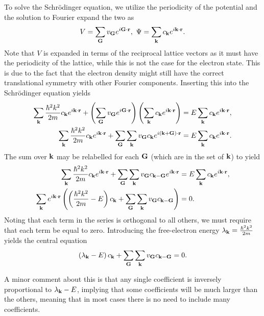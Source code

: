 To solve the Schrödinger equation, we utilize the periodicity of the potential and the solution to Fourier expand the two as
\begin{align*}
	V = \sum\limits_{\vb{G}}v_{\vb{G}}e^{i\vb{G}\cdot\vb{r}},\ \Psi = \sum\limits_{\vb{k}}c_{\vb{k}}e^{i\vb{k}\cdot\vb{r}}.
\end{align*}
Note that $V$ is expanded in terms of the reciprocal lattice vectors as it must have the periodicity of the lattice, while this is not the case for the electron state. This is due to the fact that the electron density might still have the correct translational symmetry with other Fourier components. Inserting this into the Schrödinger equation yields
\begin{align*}
	\sum\limits_{\vb{k}}\frac{\hbar^{2}k^{2}}{2m}c_{\vb{k}}e^{i\vb{k}\cdot\vb{r}} + \left(\sum\limits_{\vb{G}}v_{\vb{G}}e^{i\vb{G}\cdot\vb{r}}\right)\left(\sum\limits_{\vb{k}}c_{\vb{k}}e^{i\vb{k}\cdot\vb{r}}\right) &= E\sum\limits_{\vb{k}}c_{\vb{k}}e^{i\vb{k}\cdot\vb{r}}, \\
	\sum\limits_{\vb{k}}\frac{\hbar^{2}k^{2}}{2m}c_{\vb{k}}e^{i\vb{k}\cdot\vb{r}} + \sum\limits_{\vb{G}}\sum\limits_{\vb{k}}v_{\vb{G}}c_{\vb{k}}e^{i(\vb{k} + \vb{G})\cdot\vb{r}} &= E\sum\limits_{\vb{k}}c_{\vb{k}}e^{i\vb{k}\cdot\vb{r}}.
\end{align*}
The sum over $\vb{k}$ may be relabelled for each $\vb{G}$ (which are in the set of $\vb{k}$) to yield
\begin{align*}
	\sum\limits_{\vb{k}}\frac{\hbar^{2}k^{2}}{2m}c_{\vb{k}}e^{i\vb{k}\cdot\vb{r}} + \sum\limits_{\vb{G}}\sum\limits_{\vb{k}}v_{\vb{G}}c_{\vb{k} - \vb{G}}e^{i\vb{k}\cdot\vb{r}} &= E\sum\limits_{\vb{k}}c_{\vb{k}}e^{i\vb{k}\cdot\vb{r}}, \\
	\sum\limits_{\vb{k}}e^{i\vb{k}\cdot\vb{r}}\left(\left(\frac{\hbar^{2}k^{2}}{2m} - E\right)c_{\vb{k}} + \sum\limits_{\vb{G}}\sum\limits_{\vb{k}}v_{\vb{G}}c_{\vb{k} - \vb{G}}\right) &= 0.
\end{align*}
Noting that each term in the series is orthogonal to all others, we must require that each term be equal to zero. Introducing the free-electron energy $\lambda_{\vb{k}} = \frac{\hbar^{2}k^{2}}{2m}$ yields the central equation
\begin{align*}
	\left(\lambda_{\vb{k}} - E\right)c_{\vb{k}} + \sum\limits_{\vb{G}}\sum\limits_{\vb{k}}v_{\vb{G}}c_{\vb{k} - \vb{G}} = 0.
\end{align*}

A minor comment about this is that any single coefficient is inversely proportional to $\lambda_{\vb{k}} - E$, implying that some coefficients will be much larger than the others, meaning that in most cases there is no need to include many coefficients.


